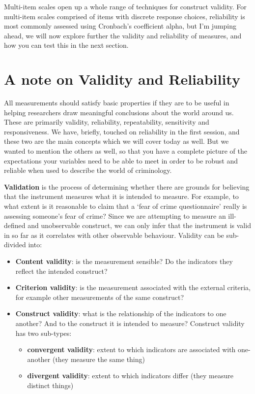 \documentclass[
]{book}
\providecommand{\tightlist}{%
  \setlength{\itemsep}{0pt}\setlength{\parskip}{0pt}}
\begin{document}
Multi-item scales open up a whole range of techniques for construct validity. For multi-item scales comprised of items with discrete response choices, reliability is most commonly assessed using Cronbach's coefficient alpha, but I'm jumping ahead, we will now explore further the validity and reliability of measures, and how you can test this in the next section.

\hypertarget{a-note-on-validity-and-reliability}{%
\section{A note on Validity and Reliability}\label{a-note-on-validity-and-reliability}}

All measurements should satisfy basic properties if they are to be useful in helping researchers draw meaningful conclusions about the world around us. These are primarily validity, reliability, repeatability, sensitivity and responsiveness. We have, briefly, touched on reliability in the first session, and these two are the main concepts which we will cover today as well. But we wanted to mention the others as well, so that you have a complete picture of the expectations your variables need to be able to meet in order to be robust and reliable when used to describe the world of criminology.

\textbf{Validation} is the process of determining whether there are grounds for believing that the instrument measures what it is intended to measure. For example, to what extent is it reasonable to claim that a `fear of crime questionnaire' really is assessing someone's fear of crime? Since we are attempting to measure an ill-defined and unobservable construct, we can only infer that the instrument is valid in so far as it correlates with other observable behaviour. Validity can be sub-divided into:

\begin{itemize}
\tightlist
\item
  \textbf{Content validity}: is the measurement sensible? Do the indicators they reflect the intended construct?
\item
  \textbf{Criterion validity}: is the measurement associated with the external criteria, for example other measurements of the same construct?
\item
  \textbf{Construct validity}: what is the relationship of the indicators to one another? And to the construct it is intended to measure? Construct validity has two sub-types:

  \begin{itemize}
  \tightlist
  \item
    \textbf{convergent validity}: extent to which indicators are associated with one-another (they measure the same thing)
  \item
    \textbf{divergent validity}: extent to which indicators differ (they measure distinct things)
  \end{itemize}
\end{itemize}
\end{document}
